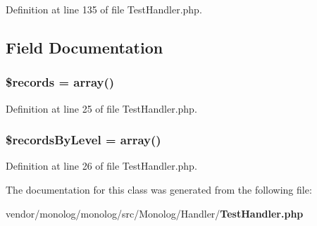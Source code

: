 Definition at line 135 of file Test\+Handler.\+php.



\subsection{Field Documentation}
\subsubsection[{\$records}]{\setlength{\rightskip}{0pt plus 5cm}\$records = array()\hspace{0.3cm}{\ttfamily [protected]}}\label{class_monolog_1_1_handler_1_1_test_handler_a6cb1988642ff4f03fdfb3658cdd14fa0}


Definition at line 25 of file Test\+Handler.\+php.

\subsubsection[{\$records\+By\+Level}]{\setlength{\rightskip}{0pt plus 5cm}\$records\+By\+Level = array()\hspace{0.3cm}{\ttfamily [protected]}}\label{class_monolog_1_1_handler_1_1_test_handler_a69dd595592ec395c48d00c72e2ffa5f2}


Definition at line 26 of file Test\+Handler.\+php.



The documentation for this class was generated from the following file\+:\begin{DoxyCompactItemize}
\item 
vendor/monolog/monolog/src/\+Monolog/\+Handler/{\bf Test\+Handler.\+php}\end{DoxyCompactItemize}
